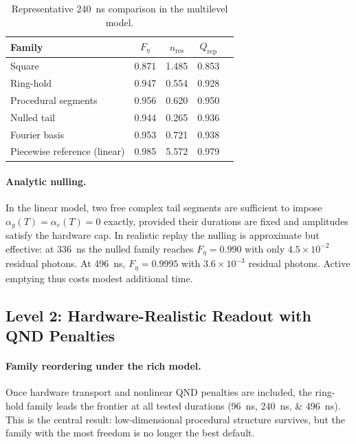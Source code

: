 \documentclass[aps,pra,twocolumn,reprint,amsmath,amssymb]{revtex4-2}
\begin{document}
\begin{table}[tp]
\centering
\caption{Representative \SI{240}{ns} comparison in the multilevel model.}
\begin{tabular}{@{} l c c c c @{}}
\toprule
Family & $F_\eta$ & $n_\mathrm{res}$ & $Q_\mathrm{rep}$ \\
\midrule
Square & 0.871 & 1.485 & 0.853 \\
Ring-hold & 0.947 & 0.554 & 0.928 \\
Procedural segments & 0.956 & 0.620 & 0.950 \\
Nulled tail & 0.944 & 0.265 & 0.936 \\
Fourier basis & 0.953 & 0.721 & 0.938 \\
Piecewise reference (linear) & 0.985 & 5.572 & 0.979 \\
\bottomrule
\end{tabular}
\label{tab:level1_comparison}
\end{table}

\paragraph{Analytic nulling.}
In the linear model, two free complex tail segments are sufficient to impose $\alpha_g(T)=\alpha_e(T)=0$ exactly, provided their durations are fixed and amplitudes satisfy the hardware cap. In realistic replay the nulling is approximate but effective: at \SI{336}{ns} the nulled family reaches $F_\eta=0.990$ with only $4.5\times 10^{-2}$ residual photons. At \SI{496}{ns}, $F_\eta=0.9995$ with $3.6\times 10^{-3}$ residual photons. Active emptying thus costs modest additional time.

\subsection{Level 2: Hardware-Realistic Readout with QND Penalties}
\label{sec:hardware}

\paragraph{Family reordering under the rich model.}
Once hardware transport and nonlinear QND penalties are included, the ring-hold family leads the frontier at all tested durations (\SIlist{96;240;496}{ns}). This is the central result: low-dimensional procedural structure survives, but the family with the most freedom is no longer the best default.
\end{document}
